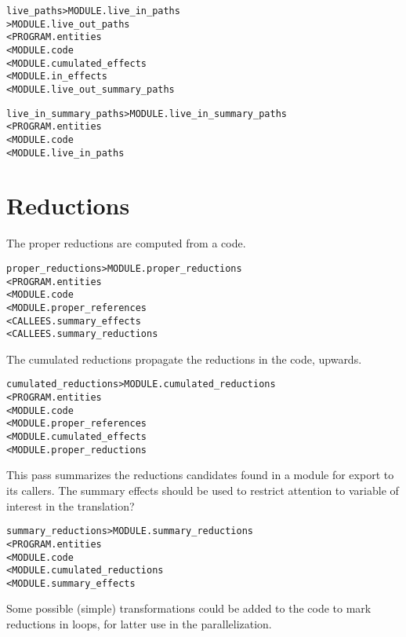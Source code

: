 \documentclass[a4paper]{report}
\newenvironment{PipsMake}{\begin{alltt}}{\end{alltt}}
\newenvironment{PipsPass}[1]{\label{pass:#1}}{}
\begin{document}
\begin{PipsMake}
live_paths     > MODULE.live_in_paths
               > MODULE.live_out_paths
        < PROGRAM.entities
        < MODULE.code
        < MODULE.cumulated_effects
        < MODULE.in_effects
        < MODULE.live_out_summary_paths
\end{PipsMake}

\begin{PipsPass}{live_summary_paths}
\end{PipsPass}


\begin{PipsMake}
live_in_summary_paths     > MODULE.live_in_summary_paths
        < PROGRAM.entities
        < MODULE.code
        < MODULE.live_in_paths
\end{PipsMake}



\section{Reductions}
\label{sec:reductions}

The proper reductions are computed from a code.

\begin{PipsMake}
proper_reductions > MODULE.proper_reductions
  < PROGRAM.entities
  < MODULE.code
  < MODULE.proper_references
  < CALLEES.summary_effects
  < CALLEES.summary_reductions
\end{PipsMake}

The cumulated reductions propagate the reductions in the code, upwards.

\begin{PipsMake}
cumulated_reductions > MODULE.cumulated_reductions
  < PROGRAM.entities
  < MODULE.code
  < MODULE.proper_references
  < MODULE.cumulated_effects
  < MODULE.proper_reductions
\end{PipsMake}

This pass summarizes the reductions candidates found in a module for
export to its callers. The summary effects should be used to restrict
attention to variable of interest in the translation?

\begin{PipsMake}
summary_reductions > MODULE.summary_reductions
  < PROGRAM.entities
  < MODULE.code
  < MODULE.cumulated_reductions
  < MODULE.summary_effects
\end{PipsMake}

Some possible (simple) transformations could be added to the code to mark
reductions in loops, for latter use in the parallelization.
\end{document}
